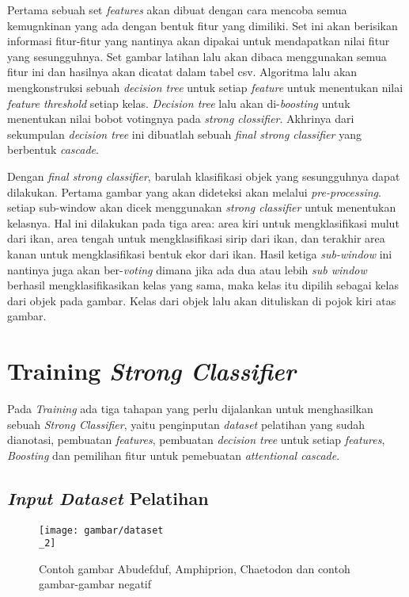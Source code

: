 Pertama sebuah set \textit{features} akan dibuat dengan cara mencoba semua kemugnkinan 
yang ada dengan bentuk fitur yang dimiliki. Set ini akan berisikan informasi fitur-fitur 
yang nantinya akan dipakai untuk mendapatkan nilai fitur yang sesungguhnya. Set gambar latihan 
lalu akan dibaca menggunakan semua fitur ini dan hasilnya akan dicatat dalam tabel csv. 
Algoritma lalu akan mengkonstruksi sebuah \emph{decision tree} untuk setiap 
\emph{feature} untuk menentukan nilai \textit{feature threshold} setiap kelas. 
\emph{Decision tree} lalu akan di-\textit{boosting} untuk menentukan nilai bobot votingnya 
pada \textit{strong clossifier}. Akhrinya dari sekumpulan \emph{decision tree} ini dibuatlah 
sebuah \emph{final strong classifier} yang berbentuk \textit{cascade}.

Dengan \emph{final strong classifier}, barulah klasifikasi objek yang sesungguhnya dapat dilakukan. 
Pertama gambar yang akan dideteksi akan melalui \emph{pre-processing}. setiap sub-window akan dicek menggunakan 
\emph{strong classifier} untuk menentukan kelasnya. Hal ini dilakukan pada tiga area: area kiri untuk 
mengklasifikasi mulut dari ikan, area tengah untuk mengklasifikasi sirip dari ikan, dan terakhir area kanan 
untuk mengklasifikasi bentuk ekor dari ikan. Hasil ketiga \textit{sub-window} ini nantinya juga akan ber-\textit{voting}
dimana jika ada dua atau lebih \textit{sub window} berhasil mengklasifikasikan kelas yang sama, maka kelas itu 
dipilih sebagai kelas dari objek pada gambar. Kelas dari objek lalu akan dituliskan di pojok kiri atas gambar.

\section{Training \emph{Strong Classifier}}

Pada \textit{Training} ada tiga tahapan yang perlu dijalankan 
untuk menghasilkan sebuah \emph{Strong Classifier}, 
yaitu penginputan \textit{dataset} pelatihan yang sudah dianotasi, 
pembuatan \emph{features}, 
pembuatan \emph{decision tree} untuk setiap \emph{features}, 
\emph{Boosting }dan pemilihan fitur untuk pemebuatan \emph{attentional cascade}.

\subsection{\textit{Input Dataset} Pelatihan}

\begin{figure}[H]
  \centering{}
	\texttt{[image: gambar/dataset\\\_2]}
  \caption{Contoh gambar Abudefduf, Amphiprion, Chaetodon dan contoh gambar-gambar negatif}
\end{figure}

